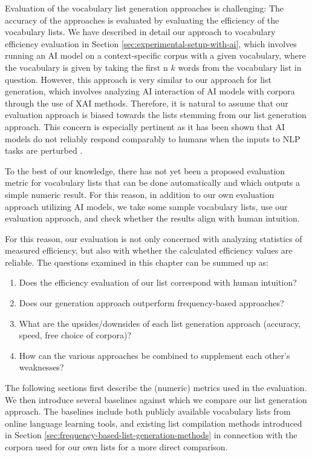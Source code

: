 Evaluation of the vocabulary list generation approaches is challenging:
The accuracy of the approaches is evaluated by evaluating the efficiency of the vocabulary lists.
We have described in detail our approach to vocabulary efficiency evaluation in Section \ref{sec:experimental-setup-with-ai}, which involves running an AI model on a context-specific corpus with a given vocabulary, where the vocabulary is given by taking the first n $k$ words from the vocabulary list in question.
However, this approach is very similar to our approach for list generation, which involves analyzing AI interaction of AI models with corpora through the use of XAI methods.
Therefore, it is natural to assume that our evaluation approach is biased towards the lists stemming from our list generation approach.
This concern is especially pertinent as it has been shown that AI models do not reliably respond comparably to humans when the inputs to NLP tasks are perturbed \cite{tjuatjaLLMsExhibitHumanlike2024}.

To the best of our knowledge, there has not yet been a proposed evaluation metric for vocabulary lists that can be done automatically and which outputs a simple numeric result.
For this reason, in addition to our own evaluation approach utilizing AI models, we take some sample vocabulary lists, use our evaluation approach, and check whether the results align with human intuition.

For this reason, our evaluation is not only concerned with analyzing statistics of measured efficiency, but also with whether the calculated efficiency values are reliable.
The questions examined in this chapter can be summed up as:
\begin{enumerate}
	\item Does the efficiency evaluation of our list correspond with human intuition?
	\item Does our generation approach outperform frequency-based approaches?
	\item What are the upsides/downsides of each list generation approach (accuracy, speed, free choice of corpora)?
	\item How can the various approaches be combined to supplement each other's weaknesses?
\end{enumerate}

The following sections first describe the (numeric) metrics used in the evaluation.
We then introduce several baselines against which we compare our list generation approach.
The baselines include both publicly available vocabulary lists from online language learning tools, and existing list compilation methods introduced in Section \ref{sec:frequency-based-list-generation-methods} in connection with the corpora used for our own lists for a more direct comparison.

